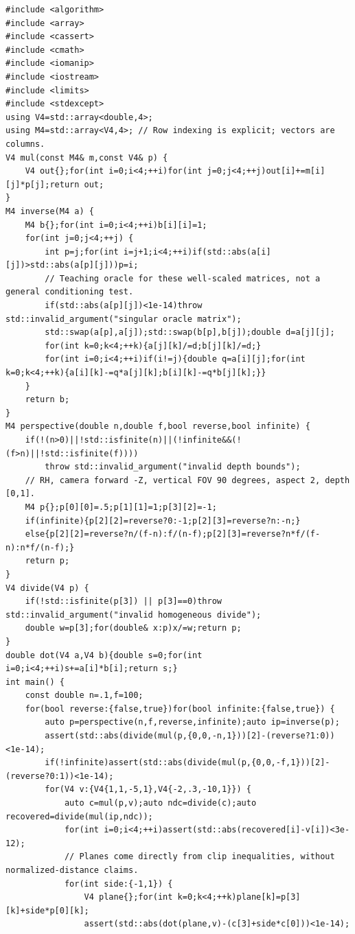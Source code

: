 \begin{verbatim}
#include <algorithm>
#include <array>
#include <cassert>
#include <cmath>
#include <iomanip>
#include <iostream>
#include <limits>
#include <stdexcept>
using V4=std::array<double,4>;
using M4=std::array<V4,4>; // Row indexing is explicit; vectors are columns.
V4 mul(const M4& m,const V4& p) {
    V4 out{};for(int i=0;i<4;++i)for(int j=0;j<4;++j)out[i]+=m[i][j]*p[j];return out;
}
M4 inverse(M4 a) {
    M4 b{};for(int i=0;i<4;++i)b[i][i]=1;
    for(int j=0;j<4;++j) {
        int p=j;for(int i=j+1;i<4;++i)if(std::abs(a[i][j])>std::abs(a[p][j]))p=i;
        // Teaching oracle for these well-scaled matrices, not a general conditioning test.
        if(std::abs(a[p][j])<1e-14)throw std::invalid_argument("singular oracle matrix");
        std::swap(a[p],a[j]);std::swap(b[p],b[j]);double d=a[j][j];
        for(int k=0;k<4;++k){a[j][k]/=d;b[j][k]/=d;}
        for(int i=0;i<4;++i)if(i!=j){double q=a[i][j];for(int k=0;k<4;++k){a[i][k]-=q*a[j][k];b[i][k]-=q*b[j][k];}}
    }
    return b;
}
M4 perspective(double n,double f,bool reverse,bool infinite) {
    if(!(n>0)||!std::isfinite(n)||(!infinite&&(!(f>n)||!std::isfinite(f))))
        throw std::invalid_argument("invalid depth bounds");
    // RH, camera forward -Z, vertical FOV 90 degrees, aspect 2, depth [0,1].
    M4 p{};p[0][0]=.5;p[1][1]=1;p[3][2]=-1;
    if(infinite){p[2][2]=reverse?0:-1;p[2][3]=reverse?n:-n;}
    else{p[2][2]=reverse?n/(f-n):f/(n-f);p[2][3]=reverse?n*f/(f-n):n*f/(n-f);}
    return p;
}
V4 divide(V4 p) {
    if(!std::isfinite(p[3]) || p[3]==0)throw std::invalid_argument("invalid homogeneous divide");
    double w=p[3];for(double& x:p)x/=w;return p;
}
double dot(V4 a,V4 b){double s=0;for(int i=0;i<4;++i)s+=a[i]*b[i];return s;}
int main() {
    const double n=.1,f=100;
    for(bool reverse:{false,true})for(bool infinite:{false,true}) {
        auto p=perspective(n,f,reverse,infinite);auto ip=inverse(p);
        assert(std::abs(divide(mul(p,{0,0,-n,1}))[2]-(reverse?1:0))<1e-14);
        if(!infinite)assert(std::abs(divide(mul(p,{0,0,-f,1}))[2]-(reverse?0:1))<1e-14);
        for(V4 v:{V4{1,1,-5,1},V4{-2,.3,-10,1}}) {
            auto c=mul(p,v);auto ndc=divide(c);auto recovered=divide(mul(ip,ndc));
            for(int i=0;i<4;++i)assert(std::abs(recovered[i]-v[i])<3e-12);
            // Planes come directly from clip inequalities, without normalized-distance claims.
            for(int side:{-1,1}) {
                V4 plane{};for(int k=0;k<4;++k)plane[k]=p[3][k]+side*p[0][k];
                assert(std::abs(dot(plane,v)-(c[3]+side*c[0]))<1e-14);

\end{verbatim}
